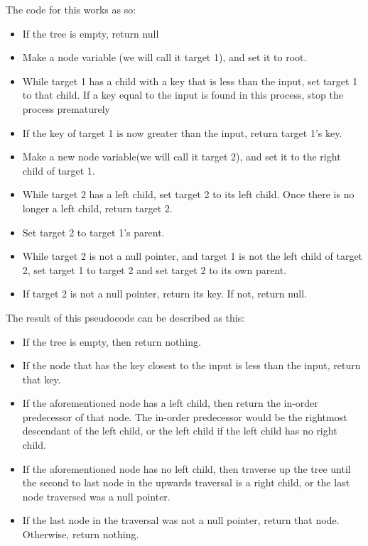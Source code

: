 \documentclass{article}
\begin{document}
\noindent
The code for this works as so:

\begin{itemize}
    \item If the tree is empty, return null
    \item Make a node variable (we will call it target 1), and set it to root.
    \item While target 1 has a child with a key that is less than the input, set target 1 to that child. If a key equal to the input is found in this process, stop the process prematurely
    \item If the key of target 1 is now greater than the input, return target 1’s key.
    \item Make a new node variable(we will call it target 2), and set it to the right child of target 1.
    \item While target 2 has a left child, set target 2 to its left child. Once there is no longer a left child, return target 2.
    \item Set target 2 to target 1’s parent.
    \item While target 2 is not a null pointer, and target 1 is not the left child of target 2, set target 1 to target 2 and set target 2 to its own parent.
    \item If target 2 is not a null pointer, return its key. If not, return null.
\end{itemize}

\noindent
The result of this pseudocode can be described as this:

\begin{itemize}
    \item If the tree is empty, then return nothing.
    \item If the node that has the key closest to the input is less than the input, return that key.
    \item If the aforementioned node has a left child, then return the in-order predecessor of that node. The in-order predecessor would be the rightmost descendant of the left child, or the left child if the left child has no right child.
    \item If the aforementioned node has no left child, then traverse up the tree until the second to last node in the upwards traversal is a right child, or the last node traversed was a null pointer.
    \item If the last node in the traversal was not a null pointer, return that node. Otherwise, return nothing.
\end{itemize}
\end{document}

